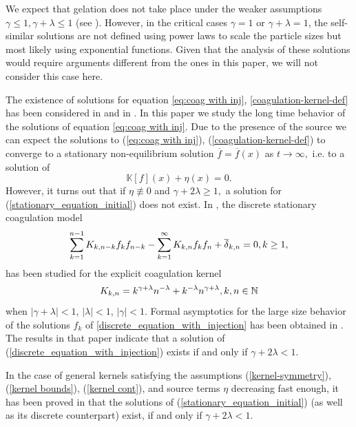 \documentclass[11pt]{article}
\numberwithin{equation}{section}
\theoremstyle{plain}
\begin{document}
We expect that gelation does not take place under the weaker assumptions $\gamma\leq 1, \gamma+\lambda\leq 1$ (see \cite{bookBanasiak}). However, in the critical cases $\gamma=1$ or $\gamma+\lambda=1$, the self-similar solutions are not defined using power laws to scale the particle sizes but most likely using exponential functions. Given that the analysis of these solutions would require arguments different from the ones in this paper, we will not consider this case here. 

The existence of solutions for equation \eqref{eq:coag with inj}, \eqref{coagulation-kernel-def} has been considered in \cite{dubovskiui1994mathematical} and in \cite{escobedo2006dust}. In this paper we study the long time  behavior of the solutions of equation \eqref{eq:coag with inj}.
Due to the presence of the source we can expect the solutions to (\ref{eq:coag with inj}), (\ref{coagulation-kernel-def}) to converge to a stationary non-equilibrium solution $\overline{f}=\overline{f}(x)$ as $t\rightarrow\infty,$ i.e. to a solution of
\begin{equation}\label{stationary_equation_initial}
    \mathbb{K}[f](x)+\eta(x)=0.
\end{equation}
However, it turns out that if $\eta\not\equiv 0$ and $\gamma+2\lambda\geq 1,$ a solution for (\ref{stationary_equation_initial}) does not exist. In \cite{hayakawa1987irreversible}, the discrete stationary coagulation model
\begin{equation}\label{discrete_equation_with_injection}
    \sum_{k=1}^{n-1}K_{k,n-k}f_{k}f_{n-k}- \sum_{k=1}^{\infty}K_{k,n}f_{k}f_{n}+\overline \delta_{k,n}=0, \textup{ } k\geq 1,
\end{equation}
 has been studied for the explicit coagulation kernel
\begin{equation}
    K_{k,n}=k^{\gamma + \lambda }n^{-\lambda }+k^{-\lambda}n^{\gamma + \lambda }, \textup{ } k,n\in\mathbb{N}
\end{equation} 
when $|\gamma + \lambda |<1$, $|\lambda |<1 $, $|\gamma |< 1$. 
 Formal asymptotics for the large size behavior of the solutions $f_k $ of \eqref{discrete_equation_with_injection} has been obtained in  \cite{hayakawa1987irreversible}. The results in that paper indicate that a solution of (\ref{discrete_equation_with_injection}) exists if and only if $\gamma+2\lambda<1$.
 
In the case of general kernels satisfying the assumptions (\ref{kernel-symmetry}),
(\ref{kernel bounds}), (\ref{kernel cont}), and source terms $\eta$ decreasing
fast enough, it has been proved in \cite{ferreira2019stationary} that the solutions of (\ref{stationary_equation_initial}) (as well as its discrete counterpart) exist, if and only if $\gamma+2\lambda<1.$
\end{document}
